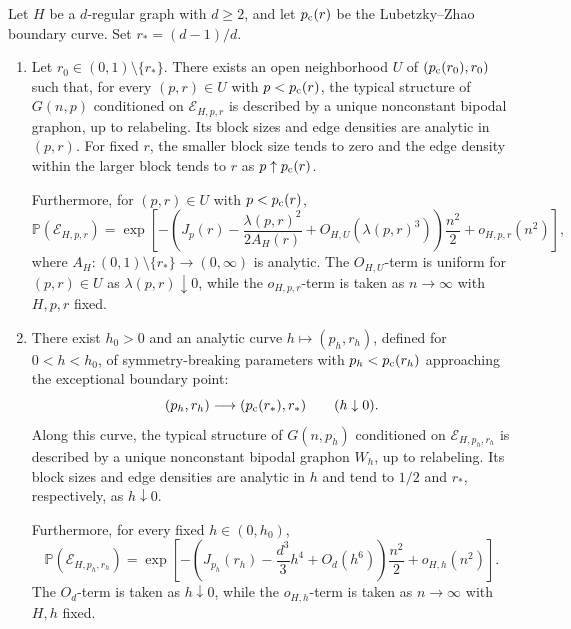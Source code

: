 \begin{theorem}\label{thm:main-results-informal}
  Let $H$ be a $d$-regular graph with $d \geq 2$, and let $p_{\mathrm c}(r)$ be the Lubetzky--Zhao boundary curve.
  Set $r_*=(d-1)/d$.
  \begin{enumerate}[label=(\alph*)]
    \item \label{thm:main-results-informal-a} Let $r_0\in(0,1)\setminus\{r_*\}$.  There exists an open
    neighborhood $U$ of $(p_{\mathrm c}(r_0),r_0)$ such that, for every
    $(p,r)\in U$ with $p<p_{\mathrm c}(r)$, the typical structure of $G(n,p)$
    conditioned on $\mathcal E_{H,p,r}$ is described by a unique nonconstant bipodal graphon,
    up to relabeling.  Its block sizes and edge densities are analytic in $(p,r)$.
    For fixed $r$, the smaller block size tends to zero and the edge density
    within the larger block tends to $r$ as $p\uparrow p_{\mathrm c}(r)$.

    Furthermore, for $(p,r)\in U$ with $p<p_{\mathrm c}(r)$,
    \[
      \mathbb P(\mathcal E_{H,p,r})
      =\exp\left[-\left(J_p(r)-\frac{\lambda(p,r)^2}{2A_H(r)}
        +O_{H,U}(\lambda(p,r)^3)\right)\frac{n^2}{2}+o_{H,p,r}(n^2)\right],
    \]
    where $A_H:(0,1)\setminus\{r_*\}\to(0,\infty)$ is analytic.
    The $O_{H,U}$-term is uniform for $(p,r)\in U$ as $\lambda(p,r)\downarrow0$,
    while the $o_{H,p,r}$-term is taken as $n\to\infty$ with $H,p,r$ fixed.

    \item \label{thm:main-results-informal-b} There exist $h_0>0$ and an analytic curve
    $h\mapsto(p_h,r_h)$, defined for $0<h<h_0$, of
    symmetry-breaking parameters with $p_h<p_{\mathrm c}(r_h)$ approaching the exceptional boundary point:
    \[
      (p_h,r_h)\longrightarrow(p_{\mathrm c}(r_*),r_*)
      \qquad(h\downarrow0).
    \]
    Along this curve, the typical structure of $G(n,p_h)$ conditioned on
    $\mathcal E_{H,p_h,r_h}$ is described by a unique nonconstant bipodal graphon
    $W_h$, up to relabeling.  Its block sizes and edge densities are analytic
    in $h$ and tend to $1/2$ and $r_*$, respectively, as $h\downarrow0$.

    Furthermore, for every fixed $h\in(0,h_0)$,
    \[
      \mathbb P(\mathcal E_{H,p_h,r_h})
      =\exp\left[-\left(J_{p_h}(r_h)-\frac{d^3}{3}h^4
        +O_d(h^6)\right)\frac{n^2}{2}+o_{H,h}(n^2)\right].
    \]
    The $O_d$-term is taken as $h\downarrow0$, while the $o_{H,h}$-term
    is taken as $n\to\infty$ with $H,h$ fixed.
  \end{enumerate}
\end{theorem}
